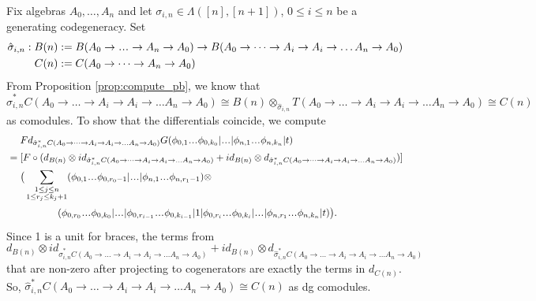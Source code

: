 \begin{eg}
\label{eg:pb4}
Fix algebras $A_0, \dots, A_n$ and let 
$\sigma_{i,n} \in \Lambda([n],[n+1])$, 
$0 \leq i \leq n$ be a generating 
codegeneracy. Set
\begin{align*}
\hat{\sigma}_{i,n}: B(n)
&:= 
B(A_0 \to \smdots \to A_n \to A_0) \to 
B(A_0 \to \dots \to A_i \to A_i 
    \to \dots A_n \to A_0)\\
C(n) 
&:= 
C(A_0 \to \dots \to A_n \to A_0)\\    
\end{align*}
From Proposition \ref{prop:compute_pb}, we 
know that $\hat{\sigma}_{i,n}^*
C(A_0 \to \dots \to A_i \to A_i \to \dots A_n \to A_0) 
\cong B(n) \otimes_{\hat{\sigma}_{i,n}} 
T(A_0 \to \dots \to A_i \to A_i \to \dots A_n \to A_0) 
\cong C(n)$ as comodules.
To show that the differentials coincide, 
we compute 
\begin{align*}
& \phantom{{}={}}
Fd_{\hat{\sigma}_{i,n}^*
  C(A_0 \to \dots \to A_i \to A_i \to \dots A_n \to A_0)}G
  (\phi_{0,1} \smdots \phi_{0,k_0} | \smdots |
  \phi_{n,1} \smdots \phi_{n,k_n} | t) \\
&=
[F \circ (d_{B(n)}\otimes 
  id_{\hat{\sigma}_{i,n}^*
  C(A_0 \to \dots \to A_i \to A_i \to \dots A_n \to A_0)} + 
  id_{B(n)} \otimes 
  d_{\hat{\sigma}_{i,n}^*
  C(A_0 \to \dots \to A_i \to A_i \to \dots A_n \to A_0)})] \\
& \phantom{{}=  {}}
\big( \sum \limits_{\substack{1 \leq j \leq n\\
  1 \leq r_j \leq k_j+1}}
  (\phi_{0,1} \smdots \phi_{0,r_0-1} | \smdots |
  \phi_{n,1} \smdots \phi_{n,r_1-1} ) \otimes \\
&\phantom{{}= \big( \sum \sum {}}
  (\phi_{0,r_0}\smdots \phi_{0,k_0}| \smdots |
  \phi_{0,r_{i-1}}\smdots \phi_{0,k_{i-1}}| 1 |
  \phi_{0,r_i}\smdots \phi_{0,k_i}| \smdots |
  \phi_{n,r_1}\smdots \phi_{n,k_n} | t) \big).
\end{align*}
Since 1 is a unit for braces, the terms from 
$d_{B(n)} \otimes id_{\hat{\sigma}_{i,n}^*
C(A_0 \to \dots \to A_i \to A_i \to \dots A_n \to A_0)} 
+ id_{B(n)} \otimes d_{\hat{\sigma}_{i,n}^*
C(A_0 \to \dots \to A_i \to A_i \to \dots A_n \to A_0)}$ 
that are non-zero after projecting to cogenerators 
are exactly the terms in $d_{C(n)}$. 
So, $\hat{\sigma}_{i,n}^*
C(A_0 \to \dots \to A_i \to A_i \to \dots A_n \to A_0) 
\cong C(n)$ 
as dg comodules.
\end{eg}
%
